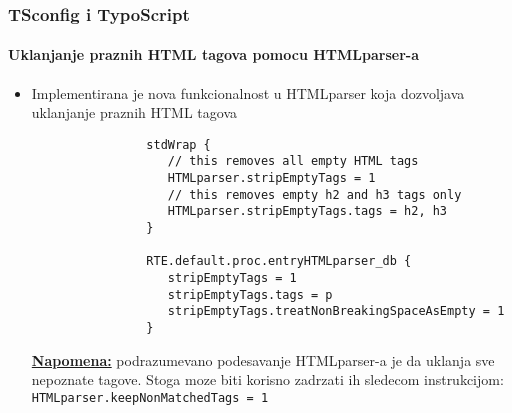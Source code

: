 \begin{frame}[fragile]
	\frametitle{TSconfig i TypoScript}
	\framesubtitle{Uklanjanje praznih HTML tagova pomocu HTMLparser-a}

	\lstset{basicstyle=\tiny\ttfamily}

	\begin{itemize}
		\item Implementirana je nova funkcionalnost u HTMLparser koja dozvoljava uklanjanje praznih HTML tagova

			\begin{lstlisting}
				stdWrap {
				   // this removes all empty HTML tags
				   HTMLparser.stripEmptyTags = 1
				   // this removes empty h2 and h3 tags only
				   HTMLparser.stripEmptyTags.tags = h2, h3
				}

				RTE.default.proc.entryHTMLparser_db {
				   stripEmptyTags = 1
				   stripEmptyTags.tags = p
				   stripEmptyTags.treatNonBreakingSpaceAsEmpty = 1
				}
			\end{lstlisting}

			\small
				\underline{\textbf{Napomena:}}
				podrazumevano podesavanje HTMLparser-a je da uklanja sve nepoznate tagove.
				Stoga moze biti korisno zadrzati ih sledecom instrukcijom:\newline
				\texttt{HTMLparser.keepNonMatchedTags = 1}
			\normalsize

	\end{itemize}

\end{frame}


